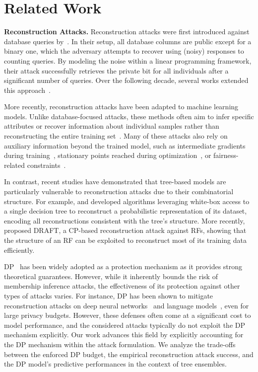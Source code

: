 \section{Related Work}
\label{sec:related_work}

\noindent
\textbf{Reconstruction Attacks.}
Reconstruction attacks were first introduced against database queries by~\citet{DBLP:conf/pods/DinurN03}. In their setup, all database columns are public except for a binary one, which the adversary attempts to recover using (noisy) responses to counting queries. By modeling the noise within a linear programming framework, their attack successfully retrieves the private bit for all individuals after a significant number of queries. Over the following decade, several works extended this approach~\mbox{\citep{dwork2017exposed}}.


More recently, reconstruction attacks have been adapted to machine learning models. Unlike database-focused attacks, these methods often aim to infer specific attributes or recover information about individual samples rather than reconstructing the entire training set~\citep{fredrikson2015model}. Many of these attacks also rely on auxiliary information beyond the trained model, such as intermediate gradients during training~\citep{DBLP:conf/atis/PhongA0WM17,DBLP:conf/uss/0001B0F020}, stationary points reached during optimization~\citep{DBLP:conf/nips/HaimVYSI22}, or fairness-related constraints~\citep{hu2020inference,hamman2022can,ferry2023exploiting}.

In contrast, recent studies have demonstrated that tree-based models are particularly vulnerable to reconstruction attacks due to their combinatorial structure. For example, \citet{DBLP:conf/dbsec/GambsGH12} and \citet{ferry2024probabilistic} developed algorithms leveraging white-box access to a single decision tree to reconstruct a probabilistic representation of its dataset, encoding all reconstructions consistent with the tree's structure. More recently, \citet{ferry2024trained} proposed DRAFT, a CP-based reconstruction attack against RFs, showing that the structure of an RF can be exploited to reconstruct most of its training data efficiently.

DP~\citep{dwork2014algorithmic} has been widely adopted as a protection mechanism as it provides strong theoretical guarantees. 
However, while it inherently bounds the risk of membership inference attacks, the effectiveness of its protection against other types of attacks varies. 
For instance, DP has been shown to mitigate reconstruction attacks on deep neural networks~\citep{ziller2024reconciling} and language models~\citep{DBLP:journals/corr/abs-2202-07623}, even for large privacy budgets.
However, these defenses often come at a significant cost to model performance, and the considered attacks typically do not exploit the DP mechanism explicitly.
Our work advances this field by explicitly accounting for the DP mechanism within the attack formulation. We analyze the trade-offs between the enforced DP budget, the empirical reconstruction attack success, and the DP model's predictive performances in the context of tree ensembles.

